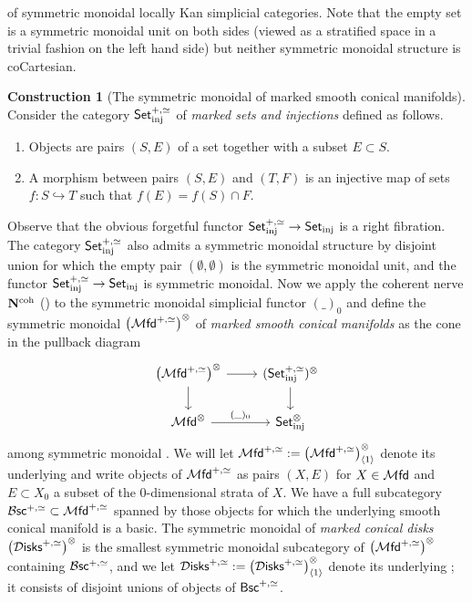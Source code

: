 \documentclass[10pt, reqno, twoside
, final
]{amsart}
\numberwithin{equation}{subsection}%
\theoremstyle{definition}
\theoremstyle{definition}
\theoremstyle{definition}
\theoremstyle{definition}
\newtheorem{cons}[defn]{Construction}
\theoremstyle{definition}
\theoremstyle{definition}
\theoremstyle{definition}
\theoremstyle{definition}
\theoremstyle{definition}
\theoremstyle{plain}
\theoremstyle{definition}
\theoremstyle{plain}
\theoremstyle{definition}
\theoremstyle{plain}
\theoremstyle{definition}
\theoremstyle{definition}
\theoremstyle{plain}
\theoremstyle{plain}
\theoremstyle{definition}
\theoremstyle{plain}
\theoremstyle{plain}
\theoremstyle{plain}
\begin{document}
of symmetric monoidal locally Kan simplicial categories. Note that the empty set is a symmetric monoidal unit on both sides (viewed as a stratified space in a trivial fashion on the left hand side) but neither symmetric monoidal structure is coCartesian.
\begin{cons}[The symmetric monoidal \infcat of marked smooth conical manifolds]\label{cons:markedmfd}
Consider the category $\mathsf{Set}_{\mathrm{inj}}^{+,\simeq}$ of \emph{marked sets and injections} defined as follows.
\begin{enumerate}
    \item[$(O)$] Objects are pairs $(S,E)$ of a set together with a subset $E\subset S$.
    \item[$(M)$] A morphism between pairs $(S,E)$ and $(T,F)$ is an injective map of sets $f:S\hookrightarrow T$ such that $f(E)=f(S) \cap F$.
\end{enumerate}
Observe that the obvious forgetful functor $\mathsf{Set}_{\mathrm{inj}}^{+,\simeq}\rightarrow \mathsf{Set}_{\mathrm{inj}}$ is a right fibration. The category $\mathsf{Set}_{\mathrm{inj}}^{+,\simeq}$ also admits a symmetric monoidal structure by disjoint union for which the empty pair $(\emptyset,\emptyset)$ is the symmetric monoidal unit, and the functor $\mathsf{Set}_{\mathrm{inj}}^{+,\simeq}\rightarrow \mathsf{Set}_{\mathrm{inj}}$ is symmetric monoidal. Now we apply the coherent nerve $\mathbf{N}^{\mathrm{coh}}$ (\cite[Definition 1.1.5.5]{LurHTT}) to the symmetric monoidal simplicial functor $(\_)_0$ and define the symmetric monoidal \infcat $\left(\mathcal{M}\mathsf{fd}^{+,\simeq}\right)^{\otimes}$ of \emph{marked smooth conical manifolds} as the cone in the pullback diagram 
\[
\begin{tikzcd}
\left(\infmfd^{+,\simeq}\right)^{\otimes} \ar[d] \ar[r] & (\set_{\mathrm{inj}}^{+,\simeq})^{\otimes} \ar[d] \\
\infmfd^{\otimes} \ar[r,"(\_)_0"] & \set_{\mathrm{inj}}^{\otimes}
\end{tikzcd}
\]
among symmetric monoidal \infcatst. We will let $\mathcal{M}\mathsf{fd}^{+,\simeq}:=\left(\mathcal{M}\mathsf{fd}^{+,\simeq}\right)^{\otimes}_{\langle 1\rangle}$ denote its underlying \infcat and write objects of $\mathcal{M}\mathsf{fd}^{+,\simeq}$ as pairs $(X,E)$ for $X \in \mathcal{M}\mathsf{fd}$ and $E\subset X_0$ a subset of the 0-dimensional strata of $X$. We have a full subcategory $\mathcal{B}\mathsf{sc}^{+,\simeq}\subset \mathcal{M}\mathsf{fd}^{+,\simeq}$ spanned by those objects for which the underlying smooth conical manifold is a basic. The symmetric monoidal \infcat of \emph{marked conical disks} $\left(\mathcal{D}\mathsf{isks}^{+,\simeq}\right)^{\otimes}$ is the smallest symmetric monoidal subcategory of $\left(\mathcal{M}\mathsf{fd}^{+,\simeq}\right)^{\otimes}$ containing $\mathcal{B}\mathsf{sc}^{+,\simeq}$, and we let $\mathcal{D}\mathsf{isks}^{+,\simeq}:=\left(\mathcal{D}\mathsf{isks}^{+,\simeq}\right)^{\otimes}_{\langle 1\rangle}$ denote its underlying \infcatt; it consists of disjoint unions of objects of $\mathsf{Bsc}^{+,\simeq}$.
\end{cons}
\end{document}
